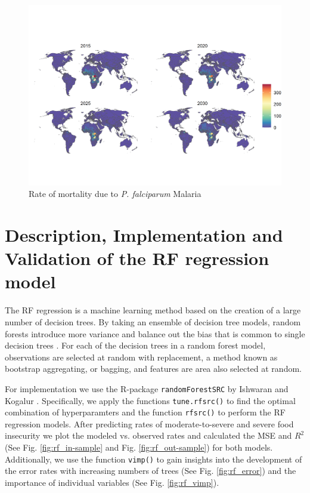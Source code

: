 \documentclass{article}
\begin{document}
\begin{figure}[H]
  \centering
  \includegraphics[width=\linewidth]{img/covars/mal_falciparum.png}
  \caption{Rate of mortality due to \textit{P. falciparum} Malaria}
\end{figure}

\section{Description, Implementation and Validation of the RF regression model}


The RF regression is a machine learning method based on the creation of a large number of decision trees. By taking an ensemble of decision tree models, random forests introduce more variance and balance out the bias that is common to single decision trees \citep{friedman2001elements}.  For each of the decision trees in a random forest model, observations are selected at random with replacement, a method known as bootstrap aggregating, or bagging, and features are area also selected at random.

For implementation we use the R-package \texttt{randomForestSRC} by Ishwaran and Kogalur \citep{ishwaran2019randomforestsrc}. Specifically, we apply the functions \texttt{tune.rfsrc()} to find the optimal combination of hyperparamters and the function \texttt{rfsrc()} to perform the RF regression models. After predicting rates of moderate-to-severe and severe food insecurity we plot the modeled vs. observed rates and calculated the MSE and ${R}^2$ (See Fig. \ref{fig:rf_in-sample} and Fig. \ref{fig:rf_out-sample}) for both models. Additionally, we use the function \texttt{vimp()} to gain insights into the development of the error rates with increasing numbers of trees (See Fig. \ref{fig:rf_error}) and the importance of individual variables (See Fig. \ref{fig:rf_vimp}).
\end{document}

